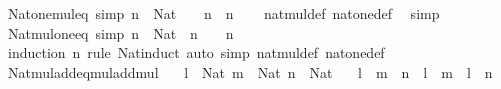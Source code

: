 \begin{isabellebody}
%
\endisadelimproof
\isanewline
{}\isamarkupfalse%
\ Nat{\isacharunderscore}{\kern0pt}one{\isacharunderscore}{\kern0pt}mul{\isacharunderscore}{\kern0pt}eq\ {\isacharbrackleft}{\kern0pt}simp{\isacharbrackright}{\kern0pt}{\isacharcolon}{\kern0pt}\ {\isachardoublequoteopen}n\ {\isacharcolon}{\kern0pt}\ Nat\ {\isasymLongrightarrow}\ {}\ {\isacharasterisk}{\kern0pt}\ n\ {\isacharequal}{\kern0pt}\ n{\isachardoublequoteclose}\isanewline
%
\isadelimproof
\ \ %
\endisadelimproof
%
\isatagproof
{}\isamarkupfalse%
\ nat{\isacharunderscore}{\kern0pt}mul{\isacharunderscore}{\kern0pt}def\ nat{\isacharunderscore}{\kern0pt}one{\isacharunderscore}{\kern0pt}def\ \isamarkupfalse%
\ simp%
\endisatagproof
{\isafoldproof}%
%
\isadelimproof
\isanewline
%
\endisadelimproof
\isanewline
{}\isamarkupfalse%
\ Nat{\isacharunderscore}{\kern0pt}mul{\isacharunderscore}{\kern0pt}one{\isacharunderscore}{\kern0pt}eq\ {\isacharbrackleft}{\kern0pt}simp{\isacharbrackright}{\kern0pt}{\isacharcolon}{\kern0pt}\ {\isachardoublequoteopen}n\ {\isacharcolon}{\kern0pt}\ Nat\ {\isasymLongrightarrow}\ n\ {\isacharasterisk}{\kern0pt}\ {}\ {\isacharequal}{\kern0pt}\ n{\isachardoublequoteclose}\isanewline
%
\isadelimproof
\ \ %
\endisadelimproof
%
\isatagproof
{}\isamarkupfalse%
\ {\isacharparenleft}{\kern0pt}induction\ n\ rule{\isacharcolon}{\kern0pt}\ Nat{\isacharunderscore}{\kern0pt}induct{\isacharparenright}{\kern0pt}\ {\isacharparenleft}{\kern0pt}auto\ simp{\isacharcolon}{\kern0pt}\ nat{\isacharunderscore}{\kern0pt}mul{\isacharunderscore}{\kern0pt}def\ nat{\isacharunderscore}{\kern0pt}one{\isacharunderscore}{\kern0pt}def{\isacharparenright}{\kern0pt}%
\endisatagproof
{\isafoldproof}%
%
\isadelimproof
\isanewline
%
\endisadelimproof
\isanewline
{}\isamarkupfalse%
\ Nat{\isacharunderscore}{\kern0pt}mul{\isacharunderscore}{\kern0pt}add{\isacharunderscore}{\kern0pt}eq{\isacharunderscore}{\kern0pt}mul{\isacharunderscore}{\kern0pt}add{\isacharunderscore}{\kern0pt}mul{\isacharcolon}{\kern0pt}\isanewline
\ \ \ {\isachardoublequoteopen}l\ {\isacharcolon}{\kern0pt}\ Nat{\isachardoublequoteclose}\ {\isachardoublequoteopen}m\ {\isacharcolon}{\kern0pt}\ Nat{\isachardoublequoteclose}\ {\isachardoublequoteopen}n\ {\isacharcolon}{\kern0pt}\ Nat{\isachardoublequoteclose}\isanewline
\ \ \ {\isachardoublequoteopen}l\ {\isacharasterisk}{\kern0pt}\ {\isacharparenleft}{\kern0pt}m\ {\isacharplus}{\kern0pt}\ n{\isacharparenright}{\kern0pt}\ {\isacharequal}{\kern0pt}\ {\isacharparenleft}{\kern0pt}l\ {\isacharasterisk}{\kern0pt}\ m{\isacharparenright}{\kern0pt}\ {\isacharplus}{\kern0pt}\ {\isacharparenleft}{\kern0pt}l\ {\isacharasterisk}{\kern0pt}\ n{\isacharparenright}{\kern0pt}{\isachardoublequoteclose}\isanewline

\end{isabellebody}
